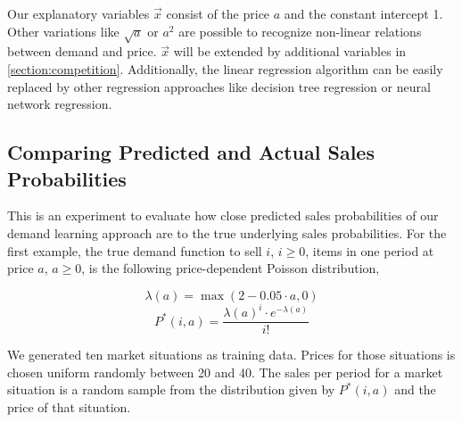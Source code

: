 Our explanatory variables $\vec{x}$ consist of the price $a$ and the constant intercept 1.
Other variations like $\sqrt{a}$ or $a^2$ are possible to recognize non-linear relations between demand and price.
$\vec{x}$ will be extended by additional variables in \cref{section:competition}.
Additionally, the linear regression algorithm can be easily replaced by other regression approaches like decision tree regression or neural network regression.

\subsection{Comparing Predicted and Actual Sales Probabilities}
\label{section:prediction_quality}

This is an experiment to evaluate how close predicted sales probabilities of our demand learning approach are to the true underlying sales probabilities.
For the first example, the true demand function to sell $i$, $i \geq 0$, items in one period at price $a$, $a \geq 0$, is the following price-dependent Poisson distribution,

\begin{equation}
\lambda(a) = \max(2 - 0.05 \cdot a, 0)
\end{equation}
\begin{equation}
P^*(i, a) = \frac{\lambda(a)^i \cdot e^{-\lambda(a)}}{i!}
\label{eq:true_poisson}
\end{equation}

We generated ten market situations as training data.
Prices for those situations is chosen uniform randomly between 20 and 40.
The sales per period for a market situation is a random sample from the distribution given by $P^*(i, a)$ and the price of that situation.

